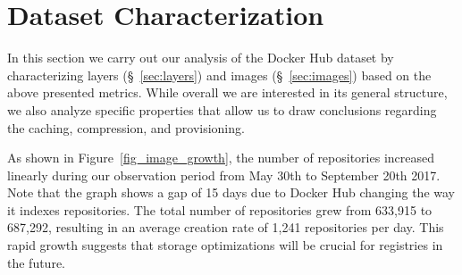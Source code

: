 \section{Dataset Characterization}
\label{sec:char}

In this section we carry out our analysis of the Docker Hub dataset by characterizing
layers (\S~\ref{sec:layers}) and images (\S~\ref{sec:images}) based on
the above presented metrics. While overall we are interested in its general structure,
we also analyze specific properties that allow us to draw conclusions regarding the
caching, compression, and provisioning.

As shown in Figure~\ref{fig_image_growth}, the number of repositories increased
linearly during our observation period from May 30th to September 20th
2017. Note that the graph shows a gap of 15 days due to Docker Hub changing the way it
indexes repositories. The total number of repositories
grew from 633,915 to 687,292, resulting in an average creation rate of 1,241
repositories per day. This rapid growth suggests that storage optimizations will
be crucial for registries in the future.

%


